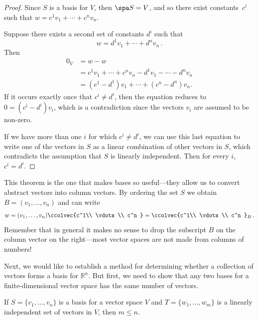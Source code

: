 \begin{proof}
Since $S$ is a basis for $V$, then $\spa S=V$, and so there exist constants~$c^i$ such that $w=c^1v_1+\cdots + c^nv_n$.

Suppose there exists a second set of constants $d^i$ such that 
\[w=d^1v_1+\cdots + d^nv_n\, .\]  Then
\begin{align*}
0_V&=w-w\\
&=c^1v_1+\cdots + c^nv_n-d^1v_1-\cdots - d^nv_n \\[1mm]
&=(c^1-d^1)v_1+\cdots + (c^n-d^n)v_n.
\end{align*}
If it occurs exactly once that $c^i\neq d^i$, then the equation reduces to $0=(c^i-d^i)v_i$, which is a contradiction since the vectors $v_i$ are assumed to be non-zero.

If we have more than one $i$ for which $c^i\neq d^i$, we can use this last equation to write one of the vectors in $S$ as a linear combination of other vectors in $S$, which contradicts the assumption that $S$ is linearly independent.  Then for every $i$, $c^i=d^i$.
\end{proof}


\begin{remark}
This theorem is the one that makes bases so useful---they allow us to convert abstract vectors into column vectors.
By ordering the set $S$ we obtain $B=(v_1,\ldots,v_n)$ and can write
\[
w=(v_1,\ldots,v_n) \ccolvec{c^1\\ \vdots\\ c^n }=\ccolvec{c^1\\ \vdots\\ c^n }_B\, .
\]
Remember that in general it makes no sense to drop the subscript $B$ on the column vector on the right---most vector spaces  are not made from  columns of numbers!
\end{remark}


Next, we would like to establish a method for determining whether a collection of vectors forms a basis for $\mathbb{R}^n$.  But first, we need to show that any two bases for a finite-dimensional vector space has the same number of vectors.

\begin{lemma}\label{mlessn}
If $S=\{v_1, \ldots, v_n \}$ is a basis for a vector space $V$ and $T=\{w_1, \ldots, w_m \}$ is a linearly independent set of vectors in $V$, then $m\leq n$.
\end{lemma}


